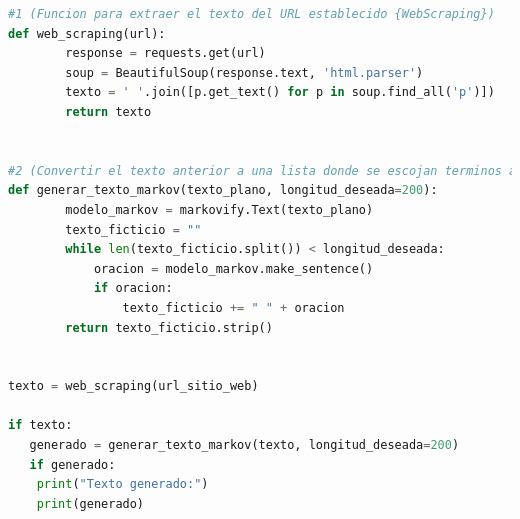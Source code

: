 \begin{enumerate}
\begin{lstlisting}[language=Python]
#1 (Funcion para extraer el texto del URL establecido {WebScraping})
def web_scraping(url):
        response = requests.get(url)
        soup = BeautifulSoup(response.text, 'html.parser')
        texto = ' '.join([p.get_text() for p in soup.find_all('p')])
        return texto


#2 (Convertir el texto anterior a una lista donde se escojan terminos aleatorios (usando la libreria de Markovify para dar mas precision a la hora de formar oraciones.))
def generar_texto_markov(texto_plano, longitud_deseada=200):
        modelo_markov = markovify.Text(texto_plano)
        texto_ficticio = ""
        while len(texto_ficticio.split()) < longitud_deseada:
            oracion = modelo_markov.make_sentence()
            if oracion:
                texto_ficticio += " " + oracion
        return texto_ficticio.strip()


texto = web_scraping(url_sitio_web)

if texto:
   generado = generar_texto_markov(texto, longitud_deseada=200)
   if generado:
    print("Texto generado:")
    print(generado)
    \end{lstlisting}
\end{enumerate}

